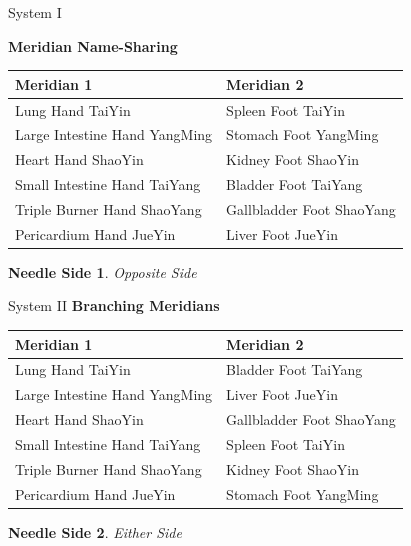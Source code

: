 \begin{frame}{System I}
  \newtheorem{ns}{Needle Side}
  \textbf{\Large Meridian Name-Sharing}

  \begin{table}[]
    \begin{tabular}{@{}ll@{}}
      \toprule
      Meridian 1                    & Meridian 2                \\ \midrule
      Lung Hand TaiYin              & Spleen Foot TaiYin        \\
      Large Intestine Hand YangMing & Stomach Foot YangMing     \\
      Heart Hand ShaoYin            & Kidney Foot ShaoYin       \\
      Small Intestine Hand TaiYang  & Bladder Foot TaiYang      \\
      Triple Burner Hand ShaoYang   & Gallbladder Foot ShaoYang \\
      Pericardium Hand JueYin       & Liver Foot JueYin         \\ \bottomrule
    \end{tabular}
  \end{table}
  \begin{ns}
    Opposite Side
  \end{ns}
\end{frame}

\begin{frame}{System II}
  \textbf{\Large Branching Meridians}
  \begin{table}[]
    \begin{tabular}{@{}ll@{}}
      \toprule
      Meridian 1                    & Meridian 2                 \\ \midrule
      Lung Hand TaiYin              & Bladder Foot TaiYang       \\
      Large Intestine Hand YangMing & Liver Foot JueYin          \\
      Heart Hand ShaoYin            & Gallbladder  Foot ShaoYang \\
      Small Intestine Hand TaiYang  & Spleen Foot TaiYin         \\
      Triple Burner Hand ShaoYang   & Kidney Foot ShaoYin        \\
      Pericardium Hand JueYin       & Stomach Foot YangMing      \\ \bottomrule
    \end{tabular}
  \end{table}

  \begin{ns}
    Either Side
  \end{ns}
\end{frame}

